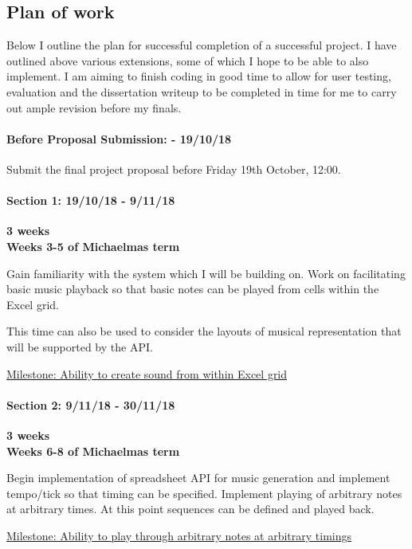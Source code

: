 \documentclass[]{article}
\let\oldparagraph\paragraph
\renewcommand{\paragraph}[1]{\oldparagraph{#1}\mbox{}}
\begin{document}
\subsection{Plan of work}\label{header-n77}

Below I outline the plan for successful completion of a successful
project. I have outlined above various extensions, some of which I hope
to be able to also implement. I am aiming to finish coding in good time
to allow for user testing, evaluation and the dissertation writeup to be
completed in time for me to carry out ample revision before my finals.

\paragraph{Before Proposal Submission: - 19/10/18}\label{header-n79}

Submit the final project proposal before Friday 19th October, 12:00.

\paragraph{Section 1: 19/10/18 - 9/11/18}\label{header-n81}

\textbf{3 weeks}\\\textbf{Weeks 3-5 of
Michaelmas term}

Gain familiarity with the system which I will be building on. Work on
facilitating basic music playback so that basic notes can be played from
cells within the Excel grid.

This time can also be used to consider the layouts of musical
representation that will be supported by the API.

\underline{Milestone: Ability to create sound from within Excel grid}

\paragraph{Section 2: 9/11/18 - 30/11/18}\label{header-n86}

\textbf{3 weeks}\\\textbf{Weeks 6-8 of
Michaelmas term}

Begin implementation of spreadsheet API for music generation and
implement tempo/tick so that timing can be specified. Implement playing
of arbitrary notes at arbitrary times. At this point sequences can be
defined and played back.

\underline{Milestone: Ability to play through arbitrary notes at
arbitrary timings}
\end{document}
